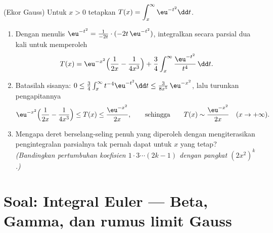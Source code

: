 \begin{exercise}[$\star\star\star$]\label{exo:b2:integration:12}
(Ekor Gauss) Untuk $x > 0$ tetapkan $T(x) = \displaystyle
\int_x^\infty \eu^{-t^2}\dd t$.
\begin{enumerate}
  \item Dengan menulis $\eu^{-t^2} = \frac{1}{-2t}\cdot(-2t\,\eu^{-t^2})$,
        integralkan secara parsial dua kali untuk memperoleh
        \[
        T(x) = \eu^{-x^2}\Bigl(\frac{1}{2x} -
        \frac{1}{4x^3}\Bigr) +
        \frac34\int_x^\infty \frac{\eu^{-t^2}}{t^4}\,\dd t .
        \]
  \item Batasilah sisanya: $0 \leq \frac34\int_x^\infty
        t^{-4}\eu^{-t^2}\dd t \leq \frac{3}{8x^5}\,\eu^{-x^2}$,
        lalu turunkan pengapitannya
        \[
        \eu^{-x^2}\Bigl(\frac{1}{2x} - \frac{1}{4x^3}\Bigr)
        \leq T(x) \leq \frac{\eu^{-x^2}}{2x},
        \qquad\text{sehingga}\qquad
        T(x) \sim \frac{\eu^{-x^2}}{2x} \quad (x \to +\infty).
        \]
  \item Mengapa deret berselang-seling penuh yang diperoleh dengan
        mengiterasikan pengintegralan parsialnya tak pernah dapat
         untuk $x$ yang tetap? \emph{(Bandingkan
        pertumbuhan koefisien $1\cdot3\cdots(2k-1)$ dengan
        pangkat $(2x^2)^k$.)}
\end{enumerate}
\end{exercise}

\section{Soal: Integral Euler --- Beta, Gamma, dan rumus limit
Gauss}

